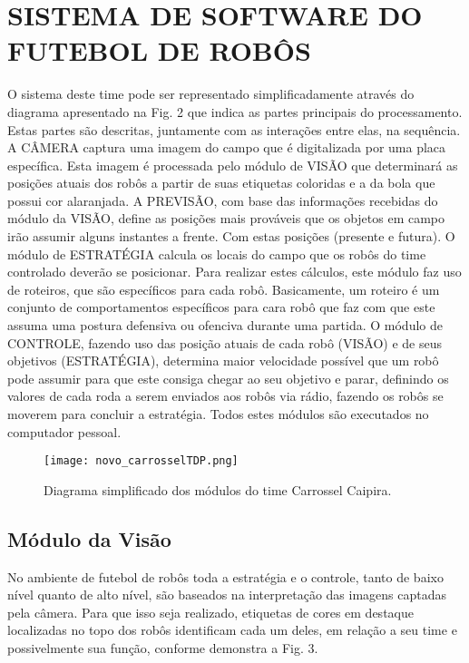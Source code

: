 \section{SISTEMA DE SOFTWARE DO FUTEBOL DE ROB{\^O}S}

O sistema deste time pode ser representado
simplificadamente atrav{\'e}s do diagrama apresentado na Fig. 2
que indica as partes principais do processamento. Estas partes
s{\~a}o descritas, juntamente com as intera{\c c}ões entre elas, na
sequ{\^e}ncia. A C{\^A}MERA captura uma imagem do campo que {\'e}
digitalizada por uma placa espec{\'i}fica. Esta imagem {\'e} processada pelo m{\'o}dulo de 
VIS{\~A}O que determinar{\'a} as posi{\c c}{\~o}es atuais dos rob{\^o}s a partir de suas etiquetas coloridas 
e a da bola que possui cor alaranjada. A PREVIS{\~A}O, com base das informações recebidas do m{\'o}dulo da
VIS{\~A}O, define as posi{\c c}{\~o}es mais prov{\'a}veis que os objetos em campo ir{\~a}o 
assumir alguns instantes a frente. Com estas posi{\c c}{\~o}es (presente e futura). O m{\'o}dulo de
ESTRAT{\'E}GIA calcula os locais do campo que os rob{\^o}s do time controlado dever{\~a}o se posicionar. 
Para realizar estes c{\'a}lculos, este m{\'o}dulo faz uso de roteiros, que são específicos para cada rob{\^o}.
Basicamente, um roteiro {\'e} um conjunto de comportamentos espec{\'i}ficos para cara rob{\^o} que faz com que
este assuma uma postura defensiva ou ofenciva durante uma partida. O m{\'o}dulo de CONTROLE, fazendo uso das 
posi{\c c}{\~a}o atuais de cada rob{\^o} (VIS{\~A}O) e de seus objetivos (ESTRAT{\'E}GIA), determina maior
velocidade poss{\'i}vel que um rob{\^o} pode assumir para que este consiga chegar ao seu objetivo e parar,
definindo os valores de cada roda a serem enviados aos rob{\^o}s via r{\'a}dio, fazendo os rob{\^o}s se moverem 
para concluir a estrat{\'e}gia. Todos estes m{\'o}dulos s{\~a}o executados no computador pessoal.

\begin{figure}[!htb]
\centering
\texttt{[image: novo\_carrosselTDP.png]}
\caption{Diagrama simplificado dos m{\'o}dulos do time Carrossel Caipira.}
\label{Rotulo}
\end{figure}

\subsection{M{\'o}dulo da Vis{\~a}o}

No ambiente de futebol de rob{\^o}s toda a estrat{\'e}gia e o
controle, tanto de baixo n{\'i}vel quanto de alto n{\'i}vel, s{\~a}o
baseados na interpreta{\c c}{\~a}o das imagens captadas pela c{\^a}mera.
Para que isso seja realizado, etiquetas de cores em destaque
localizadas no topo dos rob{\^o}s identificam cada um deles, em
rela{\c c}{\~a}o a seu time e possivelmente sua fun{\c c}{\~a}o, conforme
demonstra a Fig. 3.

